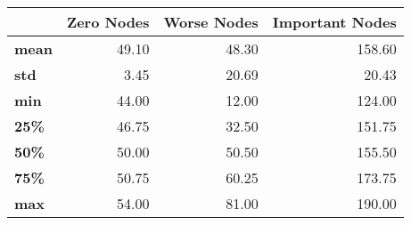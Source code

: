 \begin{tabular}{lrrr}
\toprule
{} &  Zero Nodes &  Worse Nodes &  Important Nodes \\
\midrule
\textbf{mean} &       49.10 &        48.30 &           158.60 \\
\textbf{std } &        3.45 &        20.69 &            20.43 \\
\textbf{min } &       44.00 &        12.00 &           124.00 \\
\textbf{25\% } &       46.75 &        32.50 &           151.75 \\
\textbf{50\% } &       50.00 &        50.50 &           155.50 \\
\textbf{75\% } &       50.75 &        60.25 &           173.75 \\
\textbf{max } &       54.00 &        81.00 &           190.00 \\
\bottomrule
\end{tabular}
